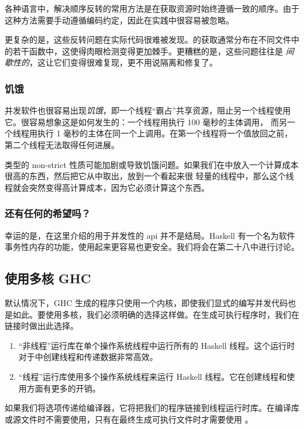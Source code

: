 \documentclass[./main.tex]{subfiles}
\begin{document}
各种语言中，解决顺序反转的常用方法是在获取资源时始终遵循一致的顺序。由于这种方法需要手动遵循编码约定，因此在实践中很容易被忽略。

更复杂的是，这些反转问题在实际代码很难被发现。的获取通常分布在不同文件中的若干函数中，这使得肉眼检测变得更加棘手。更糟糕的是，这些问题往往是
\textit{间歇性的}，这让它们变得很难复现，更不用说隔离和修复了。

\subsubsection*{饥饿}

并发软件也很容易出现\textit{饥饿}，即一个线程“霸占”共享资源，阻止另一个线程使用它。很容易想象这是如何发生的：一个线程用执行 100 毫秒的主体调用，
而另一个线程用执行 1 毫秒的主体在同一个上调用。在第一个线程将一个值放回之前，第二个线程无法取得任何进展。

类型的 non-strict 性质可能加剧或导致饥饿问题。如果我们在中放入一个计算成本很高的东西，然后把它从中取出，放到一个看起来很
轻量的线程中，那么这个线程就会突然变得高计算成本，因为它必须计算这个东西。

\subsubsection*{还有任何的希望吗？}

幸运的是，在这里介绍的用于并发性的 api 并不是结局。Haskell 有一个名为软件事务性内存的功能，使用起来更容易也更安全。我们将会在第二十八中进行讨论。

\subsection*{使用多核 GHC}

默认情况下，GHC 生成的程序只使用一个内核，即使我们显式的编写并发代码也是如此。要使用多核，我们必须明确的选择这样做。在生成可执行程序时，我们在链接时做出此选择。

\begin{enumerate}
  \item “非线程”运行库在单个操作系统线程中运行所有的 Haskell 线程。这个运行时对于中创建线程和传递数据非常高效。
  \item “线程”运行库使用多个操作系统线程来运行 Haskell 线程。它在创建线程和使用方面有更多的开销。
\end{enumerate}

如果我们将选项传递给编译器，它将把我们的程序链接到线程运行时库。在编译库或源文件时不需要使用，只有在最终生成可执行文件时才需要使用
。
\end{document}
